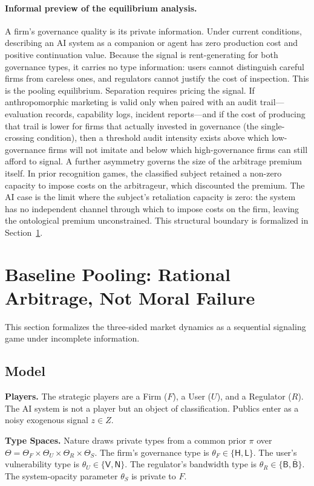 \documentclass[review,authoryear]{elsarticle}
\theoremstyle{definition}
\theoremstyle{plain}
\begin{document}
\paragraph{Informal preview of the equilibrium analysis.}
A firm's governance quality is its private information. Under current conditions, describing an AI system as a companion or agent has zero production cost and positive continuation value. Because the signal is rent-generating for both governance types, it carries no type information: users cannot distinguish careful firms from careless ones, and regulators cannot justify the cost of inspection. This is the pooling equilibrium. Separation requires pricing the signal. If anthropomorphic marketing is valid only when paired with an audit trail---evaluation records, capability logs, incident reports---and if the cost of producing that trail is lower for firms that actually invested in governance (the single-crossing condition), then a threshold audit intensity exists above which low-governance firms will not imitate and below which high-governance firms can still afford to signal. A further asymmetry governs the size of the arbitrage premium itself. In prior recognition games, the classified subject retained a non-zero capacity to impose costs on the arbitrageur, which discounted the premium. The AI case is the limit where the subject's retaliation capacity is zero: the system has no independent channel through which to impose costs on the firm, leaving the ontological premium unconstrained. This structural boundary is formalized in Section~\ref{sec:bayesian}.
\section{Baseline Pooling: Rational Arbitrage, Not Moral Failure}
\label{sec:bayesian}

This section formalizes the three-sided market dynamics as a sequential signaling game under incomplete information. 

\subsection{Model}

\textbf{Players.} The strategic players are a Firm ($F$), a User ($U$), and a Regulator ($R$). The AI system is not a player but an object of classification. Publics enter as a noisy exogenous signal $z \in Z$. 

\textbf{Type Spaces.} Nature draws private types from a common prior $\pi$ over $\Theta = \Theta_F \times \Theta_U \times \Theta_R \times \Theta_S$. The firm's governance type is $\theta_F \in \{\mathsf{H},\mathsf{L}\}$. The user's vulnerability type is $\theta_U \in \{\mathsf{V},\mathsf{N}\}$. The regulator's bandwidth type is $\theta_R \in \{\mathsf{B},\bar{\mathsf{B}}\}$. The system-opacity parameter $\theta_S$ is private to $F$.
\end{document}

